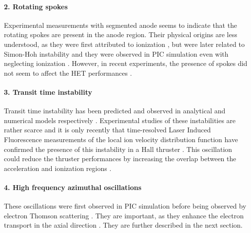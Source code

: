   \paragraph{2. Rotating spokes\\}
  Experimental measurements with segmented anode \citep{ellison2012,mcdonald2011} seems to indicate that the rotating spokes are present in the anode region.
  Their physical origins are less understood, as they were first attributed to ionization \citep{janes1966}, but were later related to Simon-Hoh instability and they were observed in \ac{PIC} simulation even with neglecting ionization \citep{carlsson2018}.
  However, in recent experiments, the presence of spokes did not seem to affect the \ac{HET} performances \citep{boeuf2018}.

  \paragraph{3. Transit time instability\\}
  Transit time instability has been predicted and observed in analytical and numerical models respectively \citep{barral2005,boeuf2018}.
  Experimental studies of these instabilities are rather scarce and it is only recently that time-resolved Laser Induced Fluorescence measurements of the local ion velocity distribution function have confirmed the presence of this instability in a Hall thruster \citep{vaudolon2015}.
  This oscillation could reduce the thruster performances by increasing the overlap between the acceleration and ionization regions \citep{boeuf2018}.

  \paragraph{4. High frequency azimuthal oscillations\\}
  These oscillations were first observed in \ac{PIC} simulation \citep{adam2004,ducrocq2006,adam2008a,heron2013} before being observed by electron Thomson scattering \citep{tsikata2009a,tsikata2009,tsikata2013}.
  They are important, as they enhance the electron transport in the axial direction \citep{adam2004,lafleur2016a}.
  They are further described in the next section.
